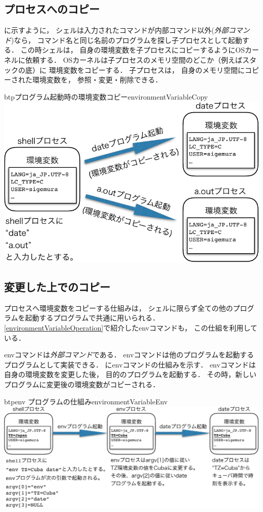 \subsection{プロセスへのコピー}
に示すように，
シェルは入力されたコマンドが内部コマンド以外(\emph{外部コマンド})なら，
コマンド名と同じ名前のプログラムを探し子プロセスとして起動する．
この時シェルは，
自身の環境変数を子プロセスにコピーするようにOSカーネルに依頼する．
OSカーネルは子プロセスのメモリ空間のどこか（例えばスタックの底）に
環境変数をコピーする．
子プロセスは，
自身のメモリ空間にコピーされた環境変数を，
参照・変更・削除できる．

\begin{myfig}{btp}{プログラム起動時の環境変数コピー}{environmentVariableCopy}
  \includegraphics[scale=0.75]{Fig/environmentVariableCopy-crop.pdf}
\end{myfig}

\subsection{変更した上でのコピー}
プロセスへ環境変数をコピーする仕組みは，
シェルに限らず全ての他のプログラムを起動するプログラムで共通に用いられる．
\ref{environmentVariableOperation}で紹介したenvコマンドも，
この仕組を利用している．

envコマンドは\emph{外部コマンド}である．
envコマンドは他のプログラムを起動するプログラムとして実装できる．
にenvコマンドの仕組みを示す．
envコマンドは自身の環境変数を変更した後，
目的のプログラムを起動する．
その時，新しいプログラムに変更後の環境変数がコピーされる．

\begin{myfig}{btp}{env プログラムの仕組み}{environmentVariableEnv}
  \includegraphics[scale=0.8]{Fig/environmentVariableEnv-crop.pdf}
\end{myfig}

